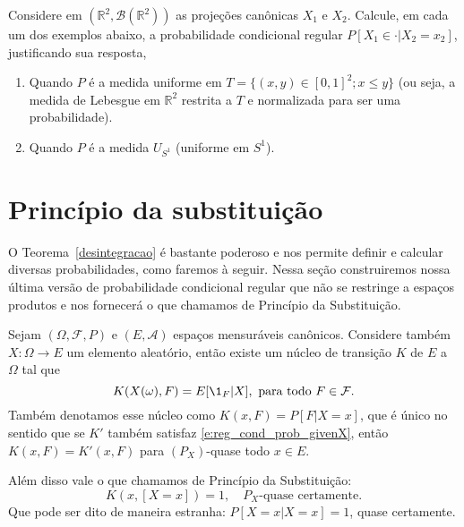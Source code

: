 \begin{exercise}
  Considere em $(\mathbb{R}^2, \mathcal{B}(\mathbb{R}^2))$ as projeções canônicas $X_1$ e $X_2$.
  Calcule, em cada um dos exemplos abaixo, a probabilidade condicional regular $P[X_1 \in \cdot|X_2 = x_2]$, justificando sua resposta,
  \begin{enumerate}[\quad a)]
  \item Quando $P$ é a medida uniforme em $T = \{(x,y) \in [0,1]^2; x \leq y\}$ (ou seja, a medida de Lebesgue em $\mathbb{R}^2$ restrita a $T$ e normalizada para ser uma probabilidade).
  \item Quando $P$ é a medida $U_{S^1}$ (uniforme em $S^1$).
  \end{enumerate}
\end{exercise}

\section{Princípio da substituição}

O Teorema~\ref{desintegracao} é bastante poderoso e nos permite definir e calcular diversas probabilidades, como faremos à seguir.
Nessa seção construiremos nossa última versão de probabilidade condicional regular que não se restringe a espaços produtos e nos fornecerá o que chamamos de Princípio da Substituição. 

\begin{theorem}
  \label{t:princ_substit}
  Sejam $(\Omega, \mathcal{F}, P)$ e $(E, \mathcal{A})$ espaços mensuráveis canônicos.
  Considere também $X: \Omega \to E$ um elemento aleatório, então existe um núcleo de transição $K$ de $E$ a $\Omega$ tal que
  \begin{equation}
    \label{e:reg_cond_prob_givenX}
    K(X(\omega), F) = E[\1_{F} | X], \text{ para todo $F \in \mathcal{F}$}.
  \end{equation}
  Também denotamos esse núcleo como $K(x, F) = P[F | X = x]$, que é único no sentido que se $K'$ 
  também satisfaz \eqref{e:reg_cond_prob_givenX}, então $K(x, F) = K'(x, F)$ para $(P_X)$-quase todo $x \in E$.

  Além disso vale o que chamamos de Princípio da Substituição:
  \begin{equation}
    \label{e:princ_substit}
    K(x, [X = x]) = 1, \quad \text{$P_X$-quase certamente}.
  \end{equation}
  Que pode ser dito de maneira estranha: $P[X = x|X = x] = 1$, quase certamente.
\end{theorem}

